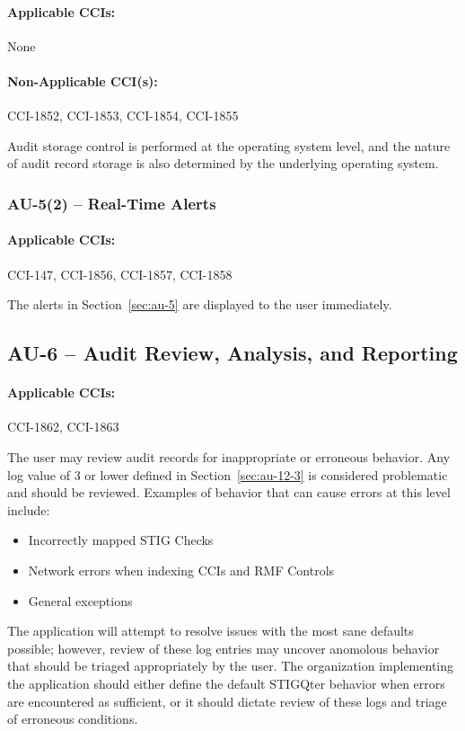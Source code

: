 \documentclass[letterpaper, 10pt, twoside]{article}
\begin{document}
\paragraph{Applicable CCIs:} None

\paragraph{Non-Applicable CCI(s):} CCI-1852, CCI-1853, CCI-1854, CCI-1855

Audit storage control is performed at the operating system level, and the nature of audit record storage is also determined by the underlying operating system.

\subsubsection{AU-5(2) -- Real-Time Alerts}

\paragraph{Applicable CCIs:} CCI-147, CCI-1856, CCI-1857, CCI-1858

The alerts in Section~\ref{sec:au-5} are displayed to the user immediately.

\subsection{AU-6 -- Audit Review, Analysis, and Reporting}

\paragraph{Applicable CCIs:} CCI-1862, CCI-1863

The user may review audit records for inappropriate or erroneous behavior. Any log value of 3 or lower defined in Section~\ref{sec:au-12-3} is considered problematic and should be reviewed. Examples of behavior that can cause errors at this level include:
\begin{itemize}
	\item Incorrectly mapped STIG Checks
	\item Network errors when indexing CCIs and RMF Controls
	\item General exceptions
\end{itemize}

The application will attempt to resolve issues with the most sane defaults possible; however, review of these log entries may uncover anomolous behavior that should be triaged appropriately by the user. The organization implementing the application should either define the default STIGQter behavior when errors are encountered as sufficient, or it should dictate review of these logs and triage of erroneous conditions.
\end{document}
